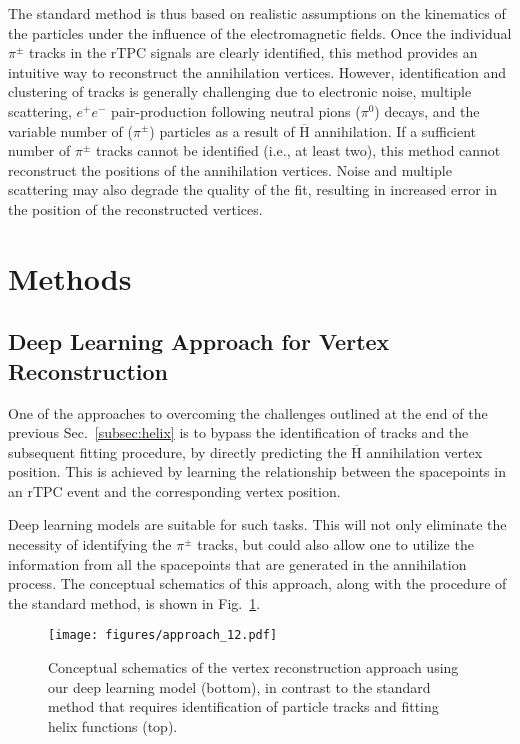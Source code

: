 \documentclass[a4paper,11pt]{article}
\begin{document}
The standard method is thus based on realistic assumptions on the kinematics of the particles under the influence of the electromagnetic fields. Once the individual $\pi^{\pm}$ tracks in the rTPC signals are clearly identified, this method provides an intuitive way to reconstruct the annihilation vertices. However, identification and clustering of tracks is generally challenging due to electronic noise, multiple scattering, $e^+e^-$ pair-production following neutral pions ($\pi^{0}$) decays, and the variable number of ($\pi^{\pm}$) particles as a result of $\overline{\mathrm{H}}$ annihilation. If a sufficient number of $\pi^{\pm}$ tracks cannot be identified (i.e., at least two), this method cannot reconstruct the positions of the annihilation vertices. Noise and multiple scattering may also degrade the quality of the fit, resulting in increased error in the position of the reconstructed vertices.

\section{\label{sec:method}Methods}
\subsection{Deep Learning Approach for Vertex Reconstruction\label{subsec:deeplearning}}
One of the approaches to overcoming the challenges outlined at the end of the previous Sec.~\ref{subsec:helix} is to bypass the identification of tracks and the subsequent fitting procedure, by directly predicting the $\overline{\mathrm{H}}$ annihilation vertex position. This is achieved by learning the relationship between the spacepoints in an rTPC event and the corresponding vertex position.

Deep learning models are suitable for such tasks. This will not only eliminate the necessity of identifying the $\pi^{\pm}$ tracks, but could also allow one to utilize the information from all the spacepoints that are generated in the annihilation process. The conceptual schematics of this approach, along with the procedure of the standard method, is shown in Fig.~\ref{fig:concept}.

\begin{figure}[htbp]
    \centering
    \texttt{[image: figures/approach\_12.pdf]}
    \caption{\label{fig:concept}Conceptual schematics of the vertex reconstruction approach using our deep learning model (bottom), in contrast to the standard method that requires identification of particle tracks and fitting helix functions (top).}
\end{figure}
\end{document}
